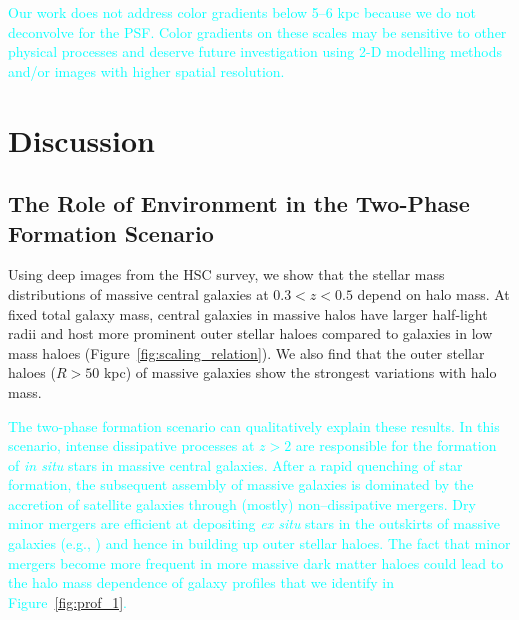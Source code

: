 \documentclass[a4paper,fleqn,usenatbib]{mnras}
\newcommand{\song}[1]{\textcolor{cyan}{#1}}
\begin{document}
    \song{
    Our work does not address color gradients below 5--6 kpc because we do not 
    deconvolve for the PSF. 
    Color gradients on these scales may be sensitive to other physical processes and 
    deserve future investigation using 2-D modelling methods and/or images with higher 
    spatial resolution.
    }
    
   

\section{Discussion}
    \label{sec:discussion}

\subsection{The Role of Environment in the Two-Phase Formation Scenario}
            
    Using deep images from the HSC survey, we show that the stellar mass distributions 
    of massive central galaxies at $0.3 < z < 0.5$ depend on halo mass. 
    At fixed total galaxy mass, central galaxies in massive halos have larger 
    half-light radii and host more prominent outer stellar haloes compared to galaxies 
    in low mass haloes (Figure~\ref{fig:scaling_relation}). 
    We also find that the outer stellar haloes ($R>50$ kpc) of massive galaxies show 
    the strongest variations with halo mass. 
    
    \song{
    The two-phase formation scenario can qualitatively explain these results. 
    In this scenario, intense dissipative processes at $z > 2$ are responsible for the 
    formation of \textit{in situ} stars in massive central galaxies. 
    After a rapid quenching of star formation, the subsequent assembly of massive 
    galaxies is dominated by the accretion of satellite galaxies through (mostly) 
    non--dissipative mergers. 
    Dry minor mergers are efficient at depositing \textit{ex situ} stars in the 
    outskirts of massive galaxies (e.g., \citealt{Oogi2013, Bedorf2013}) and hence in 
    building up outer stellar haloes. 
    The fact that minor mergers become more frequent in more massive dark matter 
    haloes could lead to the halo mass dependence of galaxy profiles that we identify 
    in Figure~\ref{fig:prof_1}.
    }
      
\end{document}
